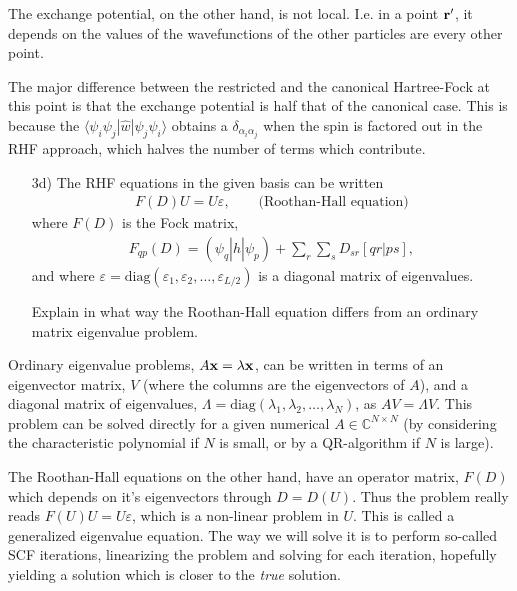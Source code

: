 \documentclass[a4paper]{article}
\newcommand{\C}{\mathbb{C}}
\begin{document}
The exchange potential, on the other hand, is not local. I.e. in a point ${\bf r}'$, it depends on the values of the wavefunctions of the other particles are every other point. 

The major difference between the restricted and the canonical Hartree-Fock at this point is that the exchange potential is half that of the canonical case. This is because the $\langle\psi_i\psi_j|\hat{w}|\psi_j\psi_i\rangle$ obtains a $\delta_{\alpha_i\alpha_j}$ when the spin is factored out in the RHF approach, which halves the number of terms which contribute.

\begin{exframe}
\begin{itemize}
  \item[3d)] The RHF equations in the given basis can be written 
  \begin{align}
  F(D)U=U\varepsilon, \ \ \ \ \ \ \ \ \ \text{(Roothan-Hall equation)}
  \end{align}
  where $F(D)$ is the Fock matrix,
  \begin{align}
  F_{qp}(D) = (\psi_q|\hat{h}|\psi_p) + \sum_r\sum_s D_{sr} [qr|ps],
  \end{align}
  and where $\varepsilon=\text{diag}(\varepsilon_1,\varepsilon_2,\dots,\varepsilon_{L/2})$ is a diagonal matrix of eigenvalues.

  Explain in what way the Roothan-Hall equation differs from an ordinary matrix eigenvalue problem.
\end{itemize}
\end{exframe}
Ordinary eigenvalue problems, $A{\bf x}=\lambda {\bf x}$, can be written in terms of an eigenvector matrix, $V$ (where the columns are the eigenvectors of $A$), and a diagonal matrix of eigenvalues, $\Lambda=\text{diag}(\lambda_1, \lambda_2, \dots, \lambda_N)$,  as $AV=\Lambda V$. This problem can be solved directly for a given numerical $A\in\C^{N\times N}$ (by considering the characteristic polynomial if $N$ is small, or by a QR-algorithm if $N$ is large).

The Roothan-Hall equations on the other hand, have an operator matrix, $F(D)$ which depends on it's eigenvectors through $D=D(U)$. Thus the problem really reads $F(U)U=U \varepsilon$, which is a non-linear problem in $U$. This is called a generalized eigenvalue equation. The way we will solve it is to perform so-called SCF iterations, linearizing the problem and solving for each iteration, hopefully yielding a solution which is closer to the \emph{true} solution.
\end{document}
